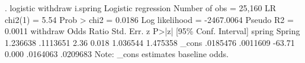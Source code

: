 . logistic withdraw i.spring
{\smallskip}
Logistic regression                             Number of obs     =     25,160
                                                LR chi2(1)        =       5.54
                                                Prob > chi2       =     0.0186
Log likelihood = -2467.0064                     Pseudo R2         =     0.0011
{\smallskip}
    withdraw {\VBAR} Odds Ratio   Std. Err.      z    P>|z|     [95\% Conf. Interval]
      spring {\VBAR}
     Spring  {\VBAR}   1.236638   .1113651     2.36   0.018     1.036544    1.475358
       _cons {\VBAR}   .0185476   .0011609   -63.71   0.000     .0164063    .0209683
Note: _cons estimates baseline odds.
{\smallskip}
